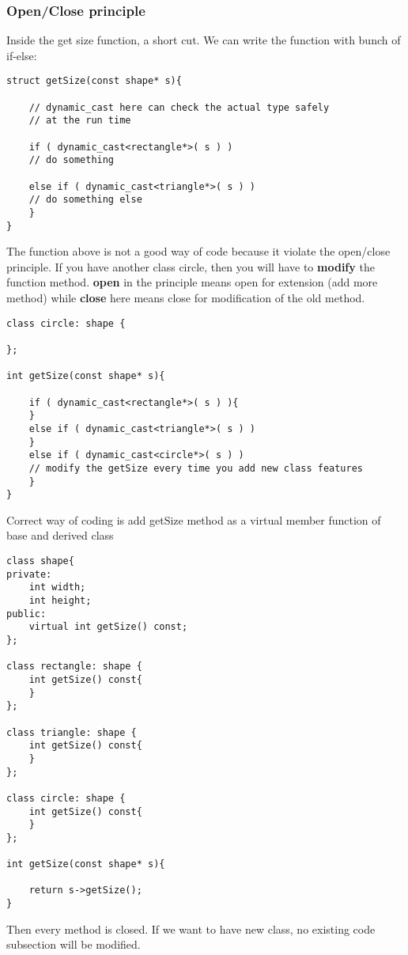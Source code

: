 \subsubsection{Open/Close principle}
Inside the get size function, a short cut. We can write the function with bunch of if-else:
\begin{lstlisting}
struct getSize(const shape* s){

	// dynamic_cast here can check the actual type safely
	// at the run time

	if ( dynamic_cast<rectangle*>( s ) )
   	// do something

	else if ( dynamic_cast<triangle*>( s ) )
   	// do something else
	}
}
\end{lstlisting}
The function above is not a good way of code because it violate the open/close principle. If you have another class circle, then you will
have to \textbf{modify} the function method. \textbf{open} in the principle means open for extension (add more method) while \textbf{close} here means
close for modification of the old method.
\begin{lstlisting}
class circle: shape {

};

int getSize(const shape* s){

	if ( dynamic_cast<rectangle*>( s ) ){
	}
	else if ( dynamic_cast<triangle*>( s ) )
	}
	else if ( dynamic_cast<circle*>( s ) )
   	// modify the getSize every time you add new class features
	}
}
\end{lstlisting}
Correct way of coding is add getSize method as a virtual member function of base and derived class
\begin{lstlisting}
class shape{
private:
	int width;
	int height;
public:
	virtual int getSize() const;
};

class rectangle: shape {
	int getSize() const{
	}
};

class triangle: shape {
	int getSize() const{
	}
};

class circle: shape {
	int getSize() const{
	}
};

int getSize(const shape* s){

	return s->getSize();
}
\end{lstlisting}
Then every method is closed. If we want to have new class, no existing code subsection will be modified.

